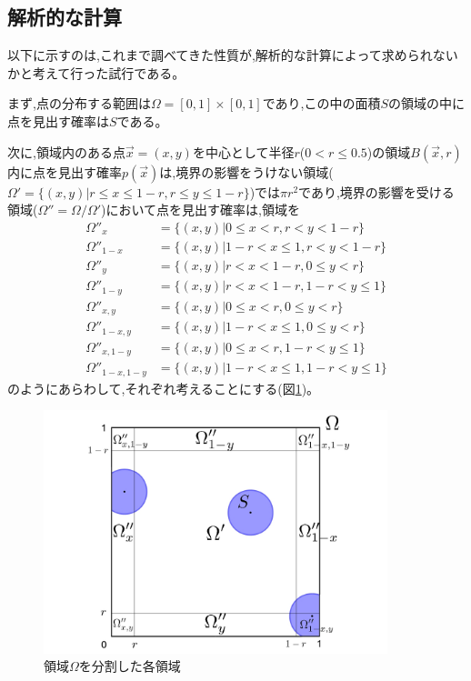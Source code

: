 \subsection{解析的な計算}
以下に示すのは,これまで調べてきた性質が,解析的な計算によって求められないかと考えて行った試行である。

まず,点の分布する範囲は$\Omega = [0,1]\times [0,1]$であり,この中の面積$S$の領域の中に点を見出す確率は$S$である。

次に,領域内のある点$\vec x=(x,y)$を中心として半径$r$($0 < r \le 0.5$)の領域$B(\vec x, r)$内に点を見出す確率$p(\vec x)$は,境界の影響をうけない領域($\Omega ' = \{(x,y) | r \le x \le 1-r, r \le y \le 1-r \}$)では$\pi r^{2}$であり,境界の影響を受ける領域($\Omega'' = \Omega / \Omega'$)において点を見出す確率は,領域を
\begin{align}
\Omega''_{x} &= \{(x,y) | 0 \le x < r, r< y < 1-r\}\nonumber \\
\Omega''_{1-x} &= \{(x,y) | 1-r < x \le 1, r< y < 1-r\}\nonumber \\
\Omega''_{y} &= \{(x,y) | r < x < 1-r, 0 \le y < r\}\nonumber \\
\Omega''_{1-y} &= \{(x,y) | r < x < 1-r, 1-r < y \le 1\}\nonumber \\
\Omega''_{x,y} &= \{(x,y) | 0 \le x < r, 0 \le y < r\}\nonumber \\
\Omega''_{1-x,y} &= \{(x,y) | 1-r < x \le 1, 0 \le y < r\}\nonumber \\
\Omega''_{x,1-y} &= \{(x,y) | 0 \le x < r, 1-r < y \le 1\}\nonumber \\
\Omega''_{1-x, 1-y} &= \{(x,y) | 1-r < x \le 1, 1-r < y \le 1\}\nonumber
\end{align}
のようにあらわして,それぞれ考えることにする(図\ref{fig:f20})。
\begin{figure}[H]
    \begin{center}
        \includegraphics[width=10cm]{../img/omega.jpg}
        \caption{領域$\Omega$を分割した各領域}
        \label{fig:f20}
    \end{center}
\end{figure}
